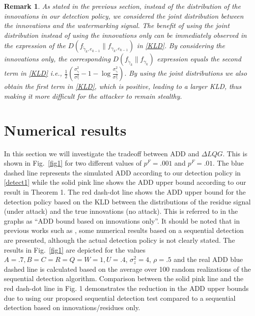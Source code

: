 \documentclass[journal,10pt]{IEEEtran}
\newtheorem{rem}{Remark}
\begin{document}
\vspace{.4cm}
\begin{rem}
As stated in the previous section, instead of the distribution of
the innovations in our detection policy, we considered the joint
distribution between the innovations and the watermarking signal. The
benefit of using the joint distribution instead of using the innovations only can be immediately observed in the expression
of the $D(f_{\widetilde{\gamma}_{k}, e_{k-1}}\|f_{\gamma_{k}, e_{k-1}})$ in \eqref{KLD}. By considering
the innovations only, the corresponding $D(f_{\widetilde{\gamma}_k} \|f_{\gamma_{k}})$ expression equals
the second term in \eqref{KLD} i.e.,
$\frac{1}{2}(\frac{\sigma_{\tilde{\gamma}}^{2}}{\sigma_{\gamma}^{2}}-1-\log\frac{\sigma_{\tilde{\gamma}}^{2}}{\sigma_{\gamma}^{2}})$.
By using the joint distributions we also obtain the first term in  \eqref{KLD}, which is positive, leading to a larger KLD, thus making it more difficult for the attacker to remain stealthy. \end{rem}


\section{Numerical results}
In this section we will investigate the tradeoff between ADD and $\Delta LQG$.
This is shown in Fig.~\ref{fig1} for two different values of $p^{F}=.001$ and
$p^{F}=.01$. The blue dashed line represents the simulated ADD according to
our detection policy in \eqref{detect1} while the solid pink line
 shows the ADD upper bound
according to our result in Theorem 1.  The red dash-dot line shows the ADD upper bound for  the detection policy 
based on the KLD between the distributions of the residue signal (under attack) and the true innovations (no attack). This is referred  to in the graphs as ``ADD bound based on innovations only''.   It should be noted that in previous works such as \cite{kumar}, some numerical results based on a sequential detection are presented, although the actual detection policy is not clearly stated.   The results in Fig.~\ref{fig1} are depicted for the values $A=.7,
B=C=R=Q=W=1, U=.4$, $\sigma_{z}^{2}=4$, $\rho=.5$ and the real ADD
blue dashed line is calculated based on the average over 100 random realizations of the sequential detection algorithm.
 Comparison between the solid pink line and the red dash-dot
line in Fig. 1  demonstrates the reduction in the ADD upper bounds  due to using our proposed sequential detection test
 compared to a sequential detection based on innovations/residues only.
\end{document}
